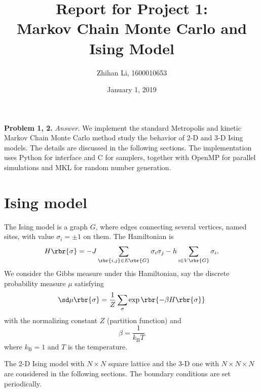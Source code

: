 \documentclass[english, nochinese]{pnote}
\title{Report for Project 1: \\ Markov Chain Monte Carlo and Ising Model}
\author{Zhihan Li, 1600010653}
\date{January 1, 2019}
\begin{document}
\maketitle

\textbf{Problem 1, 2.} \textit{Answer.} We implement the standard Metropolis and kinetic Markov Chain Monte Carlo method study the behavior of 2-D and 3-D Ising models. The details are discussed in the following sections. The implementation uses Python for interface and C for samplers, together with OpenMP for parallel simulations and MKL for random number generation.

\section{Ising model}

The Ising model is a graph $G$, where edges connecting several vertices, named sites, with value $ \sigma_i = \pm 1 $ on them. The Hamiltonian is
\begin{equation}
H \rbr{\sigma} = - J \sum_{ \rbr{ i, j } \in E \rbr{G} } \sigma_i \sigma_j - h \sum_{ i \in V \rbr{G} } \sigma_i.
\end{equation}
We consider the Gibbs measure under this Hamiltonian, say the discrete probability measure $\mu$ satisfying
\begin{equation}
\sd \mu \rbr{\sigma} = \frac{1}{Z} \sum_{\sigma} \exp \rbr{ -\beta H \rbr{\sigma} }
\end{equation}
with the normalizing constant $Z$ (partition function) and
\begin{equation}
\beta = \frac{1}{ k_{\text{B}} T }
\end{equation}
where $ k_{\text{B}} = 1 $ and $T$ is the temperature.

The 2-D Ising model with $ N \times N $ square lattice and the 3-D one with $ N \times N \times N $ are considered in the following sections. The boundary conditions are set periodically.
\end{document}
